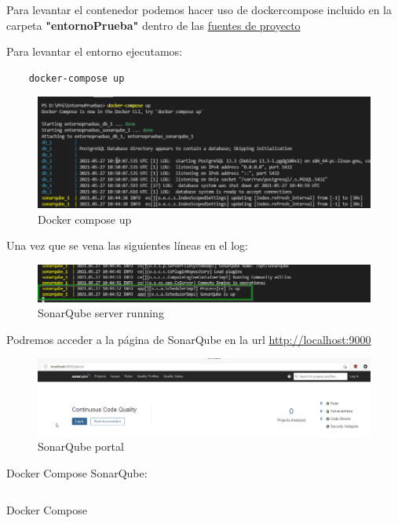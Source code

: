 Para levantar el contenedor podemos hacer uso de dockercompose incluido en la carpeta \textbf{"entornoPrueba"} dentro de 
las \href{https://github.com/M0l1n3ta/PFG/tree/master}{fuentes de proyecto}

Para levantar el entorno ejecutamos:

\begin{verbatim}
    docker-compose up
\end{verbatim}

\begin{figure}[h!]  
    \includegraphics[width=\linewidth]{./imagenes/04_DockerCompose_UP.png}
    \caption{Docker compose up}  
    \label{fig:19}
\end{figure}

Una vez que se vena las siguientes líneas en el log:
\begin{figure}[h!]  
    \includegraphics[width=\linewidth]{./imagenes/05_SonarQubeServerRunning.png}
    \caption{SonarQube server running}  
    \label{fig:20}
\end{figure}
Podremos acceder a la página de SonarQube en 
la url \href{http://localhost:9000}{http://localhost:9000}\\
\begin{figure}[h!]  
    \includegraphics[width=\linewidth]{./imagenes/06_SonarQubeServer_Webpage.png}
    \caption{SonarQube portal}  
    \label{fig:21}
\end{figure}

Docker Compose SonarQube:\\
\begin{listing}[h!]
    \inputminted{yaml}{./EntornoPruebas/SonarQube_8.2/docker-compose.yml}
    \caption{Docker Compose}
    \label{listing:3}
\end{listing}